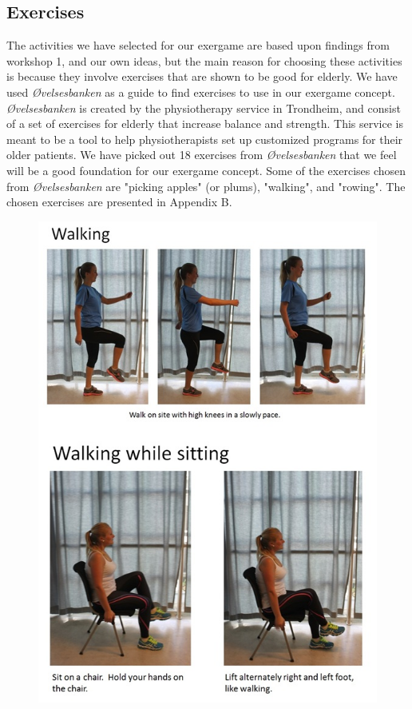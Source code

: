 \subsection{Exercises}
The activities we have selected for our exergame are based upon findings from workshop 1, and our own ideas, but the main reason for choosing these activities is because they involve exercises that are shown to be good for elderly. We have used \emph{Øvelsesbanken} \cite{eldretrening} as a guide to find exercises to use in our exergame concept. \emph{Øvelsesbanken} is created by the physiotherapy service in Trondheim, and consist of a set of exercises for elderly that increase balance and strength. This service is meant to be a tool to help physiotherapists set up customized programs for their older patients. We have picked out 18 exercises from \emph{Øvelsesbanken} that we feel will be a good foundation for our exergame concept. Some of the exercises chosen from \emph{Øvelsesbanken} are "picking apples" (or plums), "walking", and "rowing". The chosen exercises are presented in Appendix B. 

\begin{figure} [H]
\centering
\includegraphics[scale=0.7]{Walking.jpg}
\caption[Exercise - walking]{}
\label{walking}
\end{figure} 

